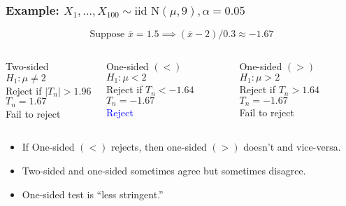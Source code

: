 \begin{frame}
  \frametitle{Example: $X_1, \dots, X_{100} \sim \mbox{iid N}(\mu,9), \alpha = 0.05$}

  \small

  \[\boxed{\mbox{Suppose } \bar{x} = 1.5 \implies (\bar{x} - 2)/0.3 \approx -1.67}\]


  \pause

  \begin{columns}
    \begin{block}{Two-sided}
      $H_1\colon \mu \neq 2$\\
      Reject if $|T_n| > 1.96$\\
      $T_n = 1.67$\\
      \alert{Fail to reject}
    \end{block}
    \begin{block}{One-sided $(<)$}
      $H_1\colon \mu < 2$\\
      Reject if $T_n < -1.64$\\
      $T_n = -1.67$\\
      \textcolor{blue}{Reject}
    \end{block}
    \begin{block}{One-sided $(>)$}
      $H_1\colon \mu > 2$\\
      Reject if $T_n > 1.64$\\
      $T_n = -1.67$\\
      \alert{Fail to reject}
    \end{block}
  \end{columns}

  \pause

  \vspace{2em}
  \begin{itemize}
    \item If One-sided $(<)$ rejects, then one-sided $(>)$ doesn't and vice-versa. \pause
    \item Two-sided and one-sided sometimes agree but sometimes disagree. \pause
    \item One-sided test is ``less stringent.''
  \end{itemize}
  
\end{frame}
